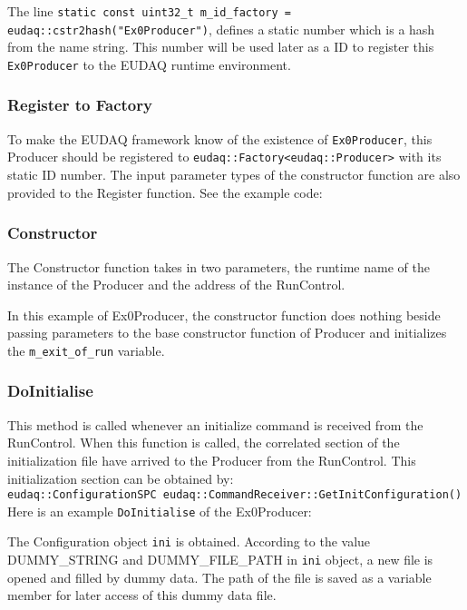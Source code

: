 

The line \lstinline[style=cpp]{static const uint32_t m_id_factory = eudaq::cstr2hash("Ex0Producer")}, defines a static number which is a hash from the name string. This number will be used later as a ID to register this \lstinline[style=cpp]{Ex0Producer} to the EUDAQ runtime environment.

\subsubsection{Register to Factory}
To make the EUDAQ framework know of the existence of \lstinline[style=cpp]{Ex0Producer}, this Producer should be registered to \lstinline[style=cpp]{eudaq::Factory<eudaq::Producer>} with its static ID number. The input parameter types of the constructor function are also provided to the Register function. See the example code:


\subsubsection{Constructor}
The Constructor function takes in two parameters, the runtime name of the instance of the Producer and the address of the RunControl. 

In this example of Ex0Producer, the constructor function does nothing beside passing parameters to the base constructor function of Producer and initializes the \lstinline[style=cpp]{m_exit_of_run} variable.

\subsubsection{DoInitialise}
This method is called whenever an initialize command is received from the RunControl. When this function is called, the correlated section of the initialization file have arrived to the Producer from the RunControl. This initialization section can be obtained by: \\
\lstinline[style=cpp]{eudaq::ConfigurationSPC eudaq::CommandReceiver::GetInitConfiguration()} \\

Here is an example \lstinline[style=cpp]{DoInitialise} of the Ex0Producer:

The Configuration object \lstinline[style=cpp]{ini} is obtained. According to the value DUMMY\_STRING and DUMMY\_FILE\_PATH in \lstinline[style=cpp]{ini} object, a new file is opened and filled by dummy data. The path of the file is saved as a variable member for later access of this dummy data file.


